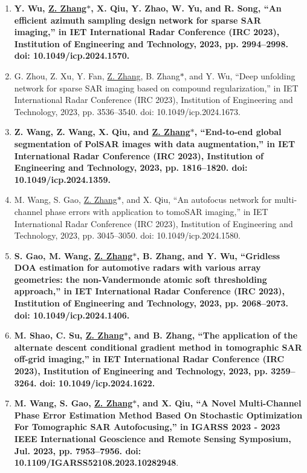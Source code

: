 \documentclass[paper=a4,fontsize=11pt]{scrartcl}
\begin{document}
\begin{enumerate}
\item \textbf{Y. Wu, \underline{Z. Zhang$\ast$}, X. Qiu, Y. Zhao, W. Yu, and R. Song, ``An efficient azimuth sampling design network for sparse SAR imaging,'' in IET International Radar Conference (IRC 2023), Institution of Engineering and Technology, 2023, pp. 2994–2998. doi: 10.1049/icp.2024.1570.}

\item G. Zhou, Z. Xu, Y. Fan, \underline{Z. Zhang}, B. Zhang$\ast$, and Y. Wu, ``Deep unfolding network for sparse SAR imaging based on compound regularization,'' in IET International Radar Conference (IRC 2023), Institution of Engineering and Technology, 2023, pp. 3536–3540. doi: 10.1049/icp.2024.1673.

\item \textbf{Z. Wang, Z. Wang, X. Qiu, and \underline{Z. Zhang$\ast$}, ``End-to-end global segmentation of PolSAR images with data augmentation,'' in IET International Radar Conference (IRC 2023), Institution of Engineering and Technology, 2023, pp. 1816–1820. doi: 10.1049/icp.2024.1359.}

\item M. Wang, S. Gao, \underline{Z. Zhang$\ast$}, and X. Qiu, ``An autofocus network for multi-channel phase errors with application to tomoSAR imaging,'' in IET International Radar Conference (IRC 2023), Institution of Engineering and Technology, 2023, pp. 3045–3050. doi: 10.1049/icp.2024.1580.

\item \textbf{S. Gao, M. Wang, \underline{Z. Zhang$\ast$}, B. Zhang, and Y. Wu, ``Gridless DOA estimation for automotive radars with various array geometries: the non-Vandermonde atomic soft thresholding approach,'' in IET International Radar Conference (IRC 2023), Institution of Engineering and Technology, 2023, pp. 2068–2073. doi: 10.1049/icp.2024.1406.}

\item \textbf{M. Shao, C. Su, \underline{Z. Zhang$\ast$}, and B. Zhang, ``The application of the alternate descent conditional gradient method in tomographic SAR off-grid imaging,'' in IET International Radar Conference (IRC 2023), Institution of Engineering and Technology, 2023, pp. 3259–3264. doi: 10.1049/icp.2024.1622.}
	
\item \textbf{ M. Wang, S. Gao, \underline{Z. Zhang$\ast$}, and X. Qiu, ``A Novel Multi-Channel Phase Error Estimation Method Based On Stochastic Optimization For Tomographic SAR Autofocusing,'' in IGARSS 2023 - 2023 IEEE International Geoscience and Remote Sensing Symposium, Jul. 2023, pp. 7953–7956. doi: 10.1109/IGARSS52108.2023.10282948}.


\end{enumerate}
\end{document}
